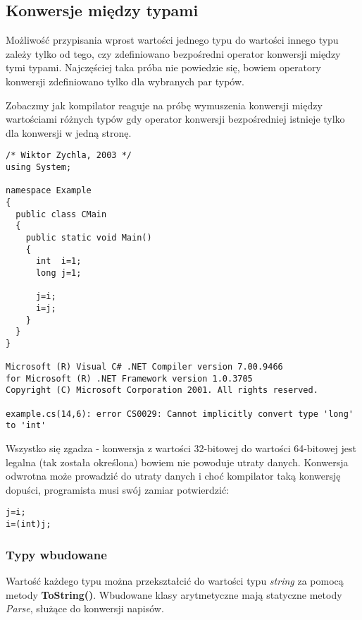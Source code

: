 ﻿\subsection{Konwersje między typami}
\label{KonwersjeMiedzyTypami}

Możliwość przypisania wprost wartości jednego 
typu do wartości innego typu zależy tylko od tego, czy zdefiniowano bezpośredni operator
konwersji między tymi typami. Najczęściej taka próba nie powiedzie się, bowiem operatory
konwersji zdefiniowano tylko dla wybranych par typów.

Zobaczmy jak kompilator reaguje na próbę wymuszenia
konwersji między wartościami różnych typów gdy operator konwersji bezpośredniej istnieje tylko
dla konwersji w jedną stronę.

\begin{scriptsize}
\begin{verbatim}
/* Wiktor Zychla, 2003 */
using System;

namespace Example
{
  public class CMain
  {
    public static void Main()
    {
      int  i=1;
      long j=1;

      j=i;
      i=j;
    }
  }
}

Microsoft (R) Visual C# .NET Compiler version 7.00.9466
for Microsoft (R) .NET Framework version 1.0.3705
Copyright (C) Microsoft Corporation 2001. All rights reserved.

example.cs(14,6): error CS0029: Cannot implicitly convert type 'long' to 'int'
\end{verbatim}
\end{scriptsize}

Wszystko się zgadza - konwersja z wartości 32-bitowej do wartości 64-bitowej jest legalna (tak została
określona) bowiem nie powoduje utraty danych. Konwersja odwrotna może prowadzić do utraty danych i
choć kompilator taką konwersję dopuści, programista musi swój zamiar potwierdzić:

\begin{scriptsize}
\begin{verbatim}
j=i;
i=(int)j;
\end{verbatim}
\end{scriptsize}

\subsubsection{Typy wbudowane}

Wartość każdego typu można przekształcić do wartości typu {\em string} za pomocą 
metody {\bf ToString()}. Wbudowane klasy arytmetyczne mają statyczne metody {\em Parse}, 
służące do konwersji napisów.

